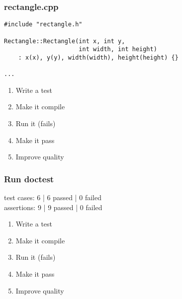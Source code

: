 \begin{frame}[fragile]
\frametitle{rectangle.cpp}
\begin{minipage}[t]{0.48\linewidth}
\begin{lstlisting}
#include "rectangle.h"

Rectangle::Rectangle(int x, int y, 
                     int width, int height)
    : x(x), y(y), width(width), height(height) {}

...
\end{lstlisting}
\end{minipage}\hfill
\begin{minipage}[t]{0.28\linewidth}
  \small
  \begin{enumerate} 
    \item \textcolor{deadcolor}{Write a test}
    \item \textcolor{deadcolor}{Make it compile}
    \item \textcolor{deadcolor}{Run it (fails)}
    \item \textcolor{activecolor}{Make it pass}
    \item \textcolor{deadcolor}{Improve quality}
  \end{enumerate} 
\end{minipage}
\end{frame}


\begin{frame}[fragile]
\frametitle{Run doctest}
\begin{minipage}[t]{0.48\linewidth}
test cases: 6 | 6 passed | 0 failed\\
assertions: 9 | 9 passed | 0 failed\\
\end{minipage}\hfill
\begin{minipage}[t]{0.28\linewidth}
  \small
  \begin{enumerate} 
    \item \textcolor{deadcolor}{Write a test}
    \item \textcolor{deadcolor}{Make it compile}
    \item \textcolor{deadcolor}{Run it (fails)}
    \item \textcolor{activecolor}{Make it pass}
    \item \textcolor{deadcolor}{Improve quality}
  \end{enumerate} 
\end{minipage}
\end{frame}
